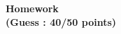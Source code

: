 \documentclass[12pt]{article}
\theoremstyle{exostyle}
\begin{document}
\begin{center}
{\bf {\Large  Homework}}\\
{\small \color{magenta} \textbf{(Guess : 40/50 points)}}
\end{center}







\end{document}
